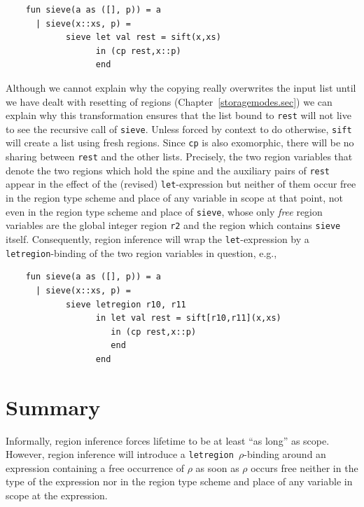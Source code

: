 \documentclass[12pt]{book}
\begin{document}
\begin{verbatim}
    fun sieve(a as ([], p)) = a
      | sieve(x::xs, p) = 
            sieve let val rest = sift(x,xs)
                  in (cp rest,x::p)
                  end
\end{verbatim}
Although we cannot explain why the copying really overwrites the input
list until we have dealt with resetting of regions (Chapter~\ref{storagemodes.sec})
we can explain why this transformation ensures that the list bound to
{\tt rest} will not live to see the recursive call of {\tt sieve}.
Unless forced by context to do otherwise, {\tt sift} 
will create a list using fresh regions. Since {\tt cp} is also exomorphic,
there will be no sharing between {\tt rest} and the other lists. Precisely,
the two region variables that denote the two regions which hold the 
spine and the auxiliary pairs of {\tt rest} appear in the effect of the
(revised) {\tt let}-expression but neither of them occur free in the
region type scheme and place of any variable in scope at that point, not
even in the region type scheme and place of {\tt sieve}, whose only {\em free}
region variables are the global integer region {\tt r2} and the region which
contains {\tt sieve} itself. Consequently, region inference will wrap
the {\tt let}-expression by a {\tt letregion}-binding of the two region
variables in question, e.g., 
\begin{verbatim}
    fun sieve(a as ([], p)) = a
      | sieve(x::xs, p) = 
            sieve letregion r10, r11
                  in let val rest = sift[r10,r11](x,xs)
                     in (cp rest,x::p)
                     end
                  end
\end{verbatim}
\section{Summary}
Informally, region inference forces lifetime to be at least ``as long'' as
scope. However, region inference will introduce a {\tt letregion $\rho$}-binding
around an expression containing a free occurrence of $\rho$ 
as soon as $\rho$ occurs free neither in the type of
the expression nor in the region type scheme and place of any variable
in scope at the expression.
\end{document}

